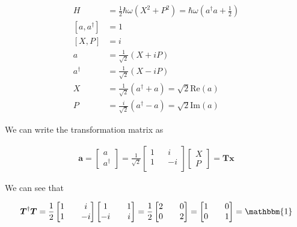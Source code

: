 \documentclass[12pt]{article}
\newcommand{\bv}[1]{\boldsymbol{#1}}
\begin{document}
\begin{align}
H &= \frac{1}{2}\hbar \omega (X^2 + P^2) = \hbar \omega \left(a^{\dag}a+\frac{1}{2}\right)\\
[a, a^{\dag}] &= 1\\
[X,P] &= i\\
a &= \frac{1}{\sqrt{2}}(X + i P)\\
a^{\dag} &= \frac{1}{\sqrt{2}}(X - i P)\\
X &= \frac{1}{\sqrt{2}}(a^{\dag} + a) = \sqrt{2}\text{Re}(a)\\
P &= \frac{i}{\sqrt{2}}(a^{\dag} - a) = \sqrt{2}\text{Im}(a)
\end{align}

We can write the transformation matrix as

\begin{align}
\bv{a} = 
\begin{bmatrix}
a\\a^{\dag}
\end{bmatrix}
= \frac{1}{\sqrt{2}}
\begin{bmatrix}
1 && i\\
1 && -i\\
\end{bmatrix}
\begin{bmatrix}
X\\P
\end{bmatrix} = \bv{T}\bv{x}
\end{align}

We can see that

\begin{align}
\bv{T}^{\dag} \bv{T} = \frac{1}{2}\begin{bmatrix}
1 && i\\
1 && -i\\
\end{bmatrix}
\begin{bmatrix}
1 && 1\\
-i && i\\
\end{bmatrix}
= \frac{1}{2}
\begin{bmatrix}
2 && 0\\
0 && 2\\
\end{bmatrix}
=
\begin{bmatrix}
1 && 0\\
0 && 1\\
\end{bmatrix}
=
\mathbbm{1}
\end{align}
\end{document}
